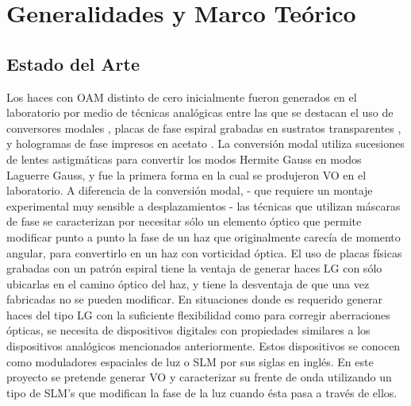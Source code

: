 

\chapter{Generalidades y Marco Teórico}
\label{cha:Gen_intro}

\graphicspath{{Figures/ch2_img/}{../Figures/ch2_img/}}

\section{Estado del Arte} %
\label{sec:ChGen_estado_del_arte}
Los haces con OAM distinto de cero inicialmente fueron generados en el
laboratorio por medio de técnicas analógicas entre las que se destacan
el uso de conversores modales , placas de fase espiral grabadas en sustratos
transparentes , y hologramas de fase impresos en acetato
 . La conversión modal utiliza sucesiones de
lentes astigmáticas para convertir los modos Hermite Gauss en modos
Laguerre Gauss, y fue la primera forma en la cual se produjeron VO en
el laboratorio. A diferencia de la conversión modal, - que requiere un
montaje experimental muy sensible a desplazamientos -  las técnicas que utilizan máscaras
de fase se caracterizan por necesitar sólo un elemento óptico que
permite modificar punto a punto la fase de un haz que originalmente
carecía de momento angular, para convertirlo en un haz con vorticidad
óptica. El uso de placas físicas grabadas con un patrón espiral
tiene la ventaja de generar haces LG con sólo ubicarlas en
el camino óptico del haz, y tiene la desventaja de que una vez
fabricadas no se pueden modificar. 
En situaciones donde es requerido generar haces del tipo LG con la suficiente
flexibilidad como para corregir aberraciones ópticas, se
necesita de dispositivos digitales con propiedades similares a los
dispositivos analógicos mencionados anteriormente. Estos dispositivos
se conocen como moduladores espaciales de luz o SLM por sus siglas en
inglés. En este proyecto se pretende generar VO y caracterizar su
frente de onda utilizando un tipo de SLM's que modifican la fase de la
luz cuando ésta pasa a través de ellos. 

